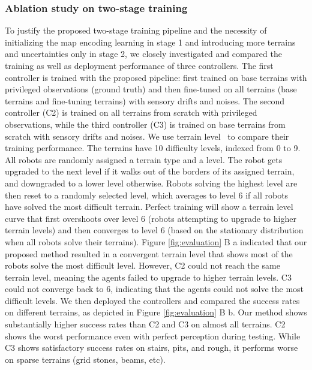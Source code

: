 \documentclass[9pt,twocolumn,twoside]{osajnl}
\begin{document}
\subsubsection{Ablation study on two-stage training}
\label{sec:ablation_two_stage}
To justify the proposed two-stage training pipeline and the necessity of initializing the map encoding learning in stage 1 and introducing more terrains and uncertainties only in stage 2, we closely investigated and compared the training as well as deployment performance of three controllers. The first controller is trained with the proposed pipeline: first trained on base terrains with privileged observations (ground truth) and then fine-tuned on all terrains (base terrains and fine-tuning terrains) with sensory drifts and noises. The second controller (C2) is trained on all terrains from scratch with privileged observations, while the third controller (C3) is trained on base terrains from scratch with sensory drifts and noises. We use terrain level~\cite{Rudin2021} to compare their training performance. The terrains have 10 difficulty levels, indexed from 0 to 9. All robots are randomly assigned a terrain type and a level. The robot gets upgraded to the next level if it walks out of the borders of its assigned terrain, and downgraded to a lower level otherwise. Robots solving the highest level are then reset to a randomly selected level, which averages to level 6 if all robots have solved the most difficult terrain. Perfect training will show a terrain level curve that first overshoots over level 6 (robots attempting to upgrade to higher terrain levels) and then converges to level 6 (based on the stationary distribution when all robots solve their terrains). Figure \ref{fig:evaluation} B a indicated that our proposed method resulted in a convergent terrain level that shows most of the robots solve the most difficult level. However, C2 could not reach the same terrain level, meaning the agents failed to upgrade to higher terrain levels. C3 could not converge back to 6, indicating that the agents could not solve the most difficult levels. We then deployed the controllers and compared the success rates on different terrains, as depicted in Figure \ref{fig:evaluation} B b. Our method shows substantially higher success rates than C2 and C3 on almost all terrains. C2 shows the worst performance even with perfect perception during testing. While C3 shows satisfactory success rates on stairs, pits, and rough, it performs worse on sparse terrains (grid stones, beams, etc). 
\end{document}
